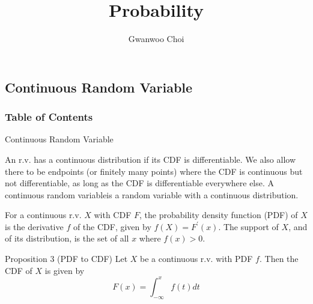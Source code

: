\documentclass[8pt]{beamer}
\title{Probability}
\author{Gwanwoo Choi}
\begin{document}
\begin{frame}
    \titlepage
\end{frame}


\subsection{Continuous Random Variable}

\begin{frame}
    \frametitle{Table of Contents}
    \tableofcontents[currentsection]
\end{frame}


\begin{frame}{Continuous Random Variable}
    \begin{definition}[Continuous r.v.]
        An r.v. has a continuous distribution if its CDF is differentiable. We also allow there to be endpoints (or finitely many points) where the CDF is continuous but not differentiable, as long as the CDF is differentiable everywhere else. A continuous random variableis a random variable with a continuous distribution.
    \end{definition}

    \begin{definition}
        For a continuous r.v. $X$ with CDF $F$, the probability density function (PDF) of $X$ is the derivative $f$ of the CDF, given by $f(X) = F^\prime(x)$. The support of $X$, and of its distribution, is the set of all $x$ where $f(x)>0$.
    \end{definition}

    \begin{block}{Proposition 3 (PDF to CDF)}
        Let $X$ be a continuous r.v. with PDF $f$. Then the CDF of $X$ is given by 
        \[F(x) = \int^x_{- \infty} f(t) dt\]
    \end{block}

\end{frame}
\end{document}

